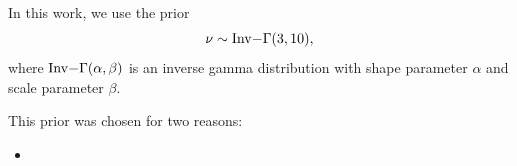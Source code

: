 \documentclass[fleqn,usenatbib]{mnras}
\begin{document}
In this work, we use the prior
\begin{equation}
    \nu \sim {\rm Inv-}\Gamma(3, 10),
\end{equation}
where ${\rm Inv-}\Gamma(\alpha, \beta)$ is an inverse gamma distribution with
{\color{red} shape parameter $\alpha$ and scale parameter $\beta$}.

This prior was chosen for two reasons:
\begin{itemize}
    \item 
\end{itemize}



\bsp	%
\label{lastpage}
\end{document}
